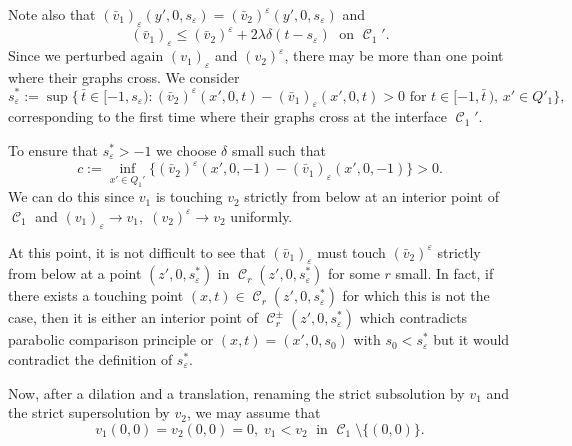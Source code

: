 \documentclass[12pt]{article}
\makeatletter
\newenvironment{customproof}[1]{%
  \par\pushQED{\qed}%
  \normalfont\topsep6pt \trivlist
  \item[\hskip\labelsep\itshape
    Proof of #1\@addpunct{.}]\ignorespaces
}{%
  \popQED\endtrivlist\@endpefalse
}
\numberwithin{Theorem}{section}
\theoremstyle{definition}
\theoremstyle{remark}
\numberwithin{equation}{section}
\DeclareMathOperator{\C}{\mathcal{C}}
\makeatother
\begin{document}
\begin{customproof}{Theorem \ref{Thm:CP}}
       Note also that $(\bar v_1)_\varepsilon (y',0,s_\varepsilon)=(\bar v_2)^{\varepsilon}(y', 0,s_\varepsilon)$ and
    \begin{equation} \label{eq:contradiction1}
     (\bar v_1)_{\varepsilon} \leq ( \bar v_2 )^{\varepsilon}+ 2\lambda\delta (t-s_\varepsilon) \; \mbox{ on }\C_1'.
       \end{equation}
Since we perturbed again $(v_1)_\varepsilon$ and $(v_2)^{\varepsilon}$, there may be more than one point where their graphs cross. We consider
        \[
    s_\varepsilon^*:= \sup \{ \, \bar t \in [-1,s_\varepsilon) : (\bar v_2)^\varepsilon (x',0,t) - (\bar v_1)_\varepsilon (x',0,t) >0 \text{ for }t \in [-1,\bar t\,),  \, x'\in Q'_1\},
    \]
    corresponding to the first time where their graphs cross at the interface $\C_1'$.
    
    To ensure that $s_{\varepsilon}^* >-1$ we choose $\delta$ small such that
    \[
    c := \inf_{x' \in Q_1'}\big\{(\bar v_2)^{\varepsilon} (x',0,-1)- (\bar v_1)_\varepsilon (x',0,-1)\big\} >0.
    \]
    We can do this
    since $v_1$ is touching $v_2$ strictly from below  at an interior point of $\C_1$ and $(v_1)_{\varepsilon} \to v_1, \; (v_2)^{\varepsilon} \to v_2$ uniformly.  
    
       At this point, it is not difficult to see that $(\bar v_1)_\varepsilon$ must touch $(\bar v_2)^\varepsilon$ strictly from below  at a point $(z',0,s_\varepsilon^*)$ in $\C_r(z',0,s_\varepsilon^*)$  for some $r$ small. In fact, if there exists a touching point $(x,t) \in \C_r(z',0,s_\varepsilon^*)$  for which this is not the case, then it is either  an interior point of $\C_r^\pm(z',0,s_\varepsilon^*)$ which contradicts parabolic comparison principle or $(x,t)=(x',0,s_0)$ with $s_0<s_\varepsilon^*$ but it would contradict the definition of $s_\varepsilon^*$. 
       
       Now, after a dilation and a translation, renaming the strict subsolution by $v_1$ and the strict supersolution by  $v_2$, we may assume that 
    \[
    v_1 (0,0)=v_2(0,0)= 0, \; v_1 < v_2 \; \text{ in } \C_1 \setminus \{(0,0)\}.
    \]



\end{customproof}
\end{document}

